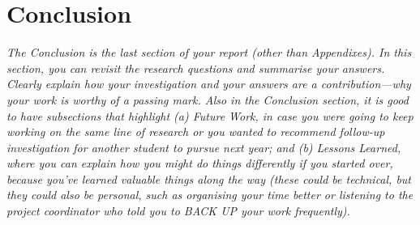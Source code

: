 \section{Conclusion}

\emph{The Conclusion is the last section of your report (other than Appendixes). In this section, you can revisit the research questions and summarise your answers. Clearly explain how your investigation and your answers are a contribution---why your work is worthy of a passing mark. Also in the Conclusion section, it is good to have subsections that highlight (a) Future Work, in case you were going to keep working on the same line of research or you wanted to recommend follow-up investigation for another student to pursue next year; and (b) Lessons Learned, where you can explain how you might do things differently if you started over, because you've learned valuable things along the way (these could be technical, but they could also be personal, such as organising your time better or listening to the project coordinator who told you to BACK UP your work frequently).}

